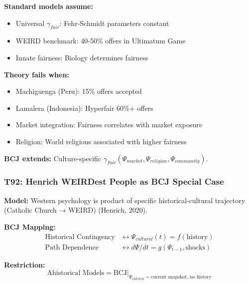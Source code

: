 \begin{tcolorbox}[colback=red!5!white, colframe=red!75!black,
    title=Boundary Condition: Where Universal Fairness Fails]
\textbf{Standard models assume:}
\begin{itemize}[nosep]
\item Universal $\gamma_{fair}$: Fehr-Schmidt parameters constant
\item WEIRD benchmark: 40-50\% offers in Ultimatum Game
\item Innate fairness: Biology determines fairness
\end{itemize}

\textbf{Theory fails when:}
\begin{itemize}[nosep]
\item Machiguenga (Peru): 15\% offers accepted
\item Lamalera (Indonesia): Hyperfair 60\%+ offers
\item Market integration: Fairness correlates with market exposure
\item Religion: World religions associated with higher fairness
\end{itemize}

\textbf{BCJ extends:} Culture-specific $\gamma_{fair}(\Psi_{market}, \Psi_{religion}, \Psi_{community})$.
\end{tcolorbox}

\subsubsection*{T92: Henrich WEIRDest People as BCJ Special Case}

\textbf{Model:} Western psychology is product of specific historical-cultural trajectory (Catholic Church → WEIRD) (Henrich, 2020).

\textbf{BCJ Mapping:}
\begin{align}
\text{Historical Contingency} &\leftrightarrow \Psi_{cultural}(t) = f(\text{history}) \\
\text{Path Dependence} &\leftrightarrow d\Psi/dt = g(\Psi_{t-1}, \text{shocks})
\end{align}

\textbf{Restriction:}
\begin{equation}
\text{Ahistorical Models} = \text{BCJ} \big|_{\Psi_{cultural} = \text{current snapshot}, \, \text{no history}}
\end{equation}

